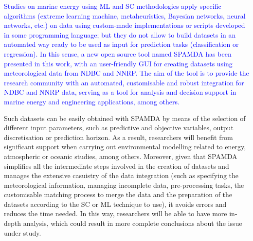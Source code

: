 \documentclass[energies,article,submit,moreauthors,pdftex]{Definitions/mdpi}
\begin{document}
		
		\textcolor{blue}{Studies on marine energy using ML and SC methodologies apply specific algorithms (extreme learning machine, metaheuristics, Bayesian networks, neural networks, etc.) on data using custom-made implementations or scripts developed in some programming language; but they do not allow to build datasets in an automated way ready to be used as input for prediction tasks (classification or regression). In this sense, a new open source tool named SPAMDA has been presented in this work, with an user-friendly GUI for creating datasets using meteorological data from NDBC and NNRP. The aim of the tool is to provide the research community with an automated, customisable and robust integration for NDBC and NNRP data, serving as a tool for analysis and decision support in marine energy and engineering applications, among others.}
		
		Such datasets can be easily obtained with SPAMDA by means of the selection of different input parameters, such as predictive and objective variables, output discretisation or prediction horizon. As a result, researchers will benefit from significant support when carrying out environmental modelling related to energy, atmospheric or oceanic studies, among others. Moreover, given that SPAMDA simplifies all the intermediate steps involved in the creation of datasets and manages the extensive casuistry of the data integration (such as specifying the meteorological information, managing incomplete data, pre-processing tasks, the customisable matching process to merge the data and the preparation of the datasets according to the SC or ML technique to use), it avoids errors and reduces the time needed. In this way, researchers will be able to have more in-depth analysis, which could result in more complete conclusions about the issue under study.
		
\end{document}
